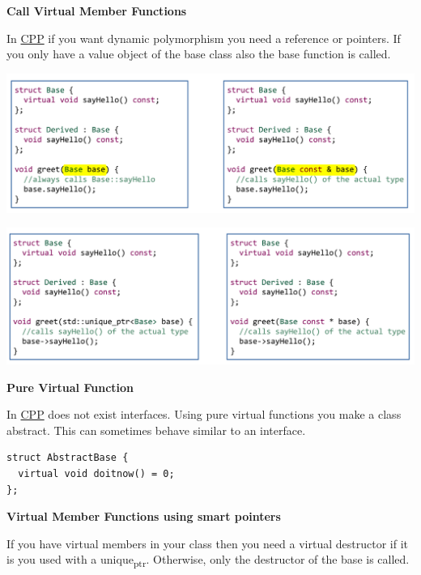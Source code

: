 \documentclass[11pt,twoside,landscape]{article}
\begin{document}
\begin{multicols}{3}
\textbf{Call Virtual Member Functions}

In \href{../../../roam/20210920103243-c.org}{CPP} if you want dynamic polymorphism you need a reference or pointers.
If you only have a value object of the base class also the base function is called.


{
\begin{center}
\includegraphics[width=.9\linewidth]{img/calling_virtual_member_functions.png}
\end{center}
}

{
\begin{center}
\includegraphics[width=.9\linewidth]{img/virtual_member_function2.png}
\end{center}
}

\textbf{Pure Virtual Function}

In \href{../../../roam/20210920103243-c.org}{CPP} does not exist interfaces.
Using pure virtual functions you make a class abstract.
This can sometimes behave similar to an interface.


\lstset{language=c++,label= ,caption= ,captionpos=b,numbers=none}
\begin{lstlisting}
struct AbstractBase {
  virtual void doitnow() = 0;
};
\end{lstlisting}

\textbf{Virtual Member Functions using smart pointers}

If you have virtual members in your class then you need a virtual destructor if it is you used with a unique\textsubscript{ptr}.
Otherwise, only the destructor of the base is called.


\end{multicols}
\end{document}
